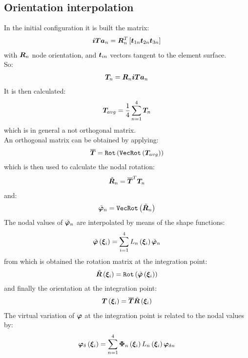 \subsection{Orientation interpolation}
In the initial configuration it is built the matrix:
\begin{equation}
\bm{ iTa }_n = \bm{ R }_n^T \left[  \bm{ t }_{ 1n } \bm{ t }_{ 2n } \bm{ t }_{ 3n }  \right]
\end{equation}
with $\bm{ R }_n$ node orientation, and $\bm{t}_{in}$ vectors tangent to the element surface.\\
So:
\begin{equation}
\bm{T}_{n} = \bm{ R }_n \bm{ iTa }_n
\end{equation}
It is then calculated:
\begin{equation}
\bm{ T }_{ avg } = \frac{ \displaystyle{  1  } }{ \displaystyle{  4  }} \sum_{ n = 1 }^{ 4 } \bm{ T }_n
\end{equation}
which is in general a not orthogonal matrix.\\
An orthogonal matrix can be obtained by applying:
\begin{equation}
\overline{ \bm{ T } } = \texttt{Rot} \left(   \texttt{VecRot} \left(   \bm{ T }_{avg}   \right)    \right)
\end{equation}
which is then used to calculate the nodal rotation:
\begin{equation}
\tilde{ \bm{ R } }_{ n } = \overline{ \bm{ T } } ^T \bm{ T }_n
\end{equation}
and:
\begin{equation}
\tilde{ \bm{\varphi} }_n = \texttt{VecRot} \left(   \tilde{ \bm{ R } }_n   \right)
\end{equation}
The nodal values of $\tilde{ \bm{\varphi} }_n$ are interpolated by means of the shape functions:
\begin{equation}
\tilde{ \bm{ \varphi } } \left(  \bm{ \xi }_{ i }  \right) = \sum_{ i = 1 }^{ 4 } L_n \left(  \bm{ \xi }_{ i }  \right) \tilde{ \bm{ \varphi } }_n
\end{equation}
from which is obtained the rotation matrix at the integration point:
\begin{equation}
\tilde{ \bm{ R } } \left(  \bm{ \xi }_{ i }  \right) = \texttt{Rot} \left(   \tilde{ \bm{\varphi} } \left(  \bm{ \xi }_{ i }  \right)   \right)
\end{equation}
and finally the orientation at the integration point:
\begin{equation}
\bm{ T } \left(  \bm{ \xi }_{ i }  \right) = \overline{ \bm{ T } } \tilde{ \bm{ R } } \left(  \bm{ \xi }_{ i }  \right)
\end{equation}
The virtual variation of $\bm{\varphi}$ at the integration point is related to the nodal values by:
\begin{equation}
\bm{ \varphi }_{\delta} \left(  \bm{ \xi }_{ i }  \right) =
\sum_{ n = 1 }^{ 4 } \bm{ \Phi }_n \left(  \bm{ \xi }_{ i }  \right) L_n \left(  \bm{ \xi }_{ i }  \right) \bm{\varphi}_{\delta n}
\end{equation}
